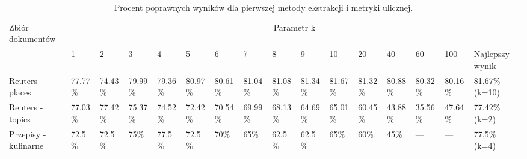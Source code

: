 \documentclass{classrep}
\begin{document}
\begingroup
{\scriptsize  
\setlength{\LTleft}{-20cm plus -1fill}
\setlength{\LTright}{\LTleft}

\clearpage

\begin{longtable}{|p{1cm}|p{0.7cm}|p{0.7cm}|p{0.7cm}|p{0.7cm}|p{0.7cm}|p{0.7cm}|p{0.7cm}|p{0.7cm}|p{0.7cm}|p{0.7cm}|p{0.7cm}|p{0.7cm}|p{0.7cm}|p{0.7cm}|p{1.1cm}|}
\caption{ Procent poprawnych wyników dla pierwszej metody ekstrakcji i metryki ulicznej.}\\ 
\hline

Zbiór
dokumentów

 &\multicolumn{15}{c|}{Parametr k}\\
\cline{2-16}
& 1
& 2
& 3
& 4
& 5
& 6
& 7
& 8
& 9
& 10
& 20
& 40
& 60
& 100
& Najlepszy wynik
\\ \hline\hline
Reuters
- places
& 77.77\%	%
& 74.43\%	%
& 79.99\%	%
& 79.36\%	%
& 80.97\%	%
& 80.61\%	%
& 81.04\%	%
& 81.08\%	%
& 81.34\%	%
& 81.67\%	%
& 81.32\%	%
& 80.88\%	%
& 80.32\%	%
& 80.16\%	%
& 81.67\% (k=10)
\\ \hline
Reuters
- topics
& 77.03\%	%
& 77.42\%	%
& 75.37\%	%
& 74.52\%	%
& 72.42\%	%
& 70.54\%	%
& 69.99\%	%
& 68.13\%	%
& 64.69\%	%
& 65.01\%	%
& 60.45\%	%
& 43.88\%	%
& 35.56\%	%
& 47.64\%	%
& 77.42\%	(k=2)
\\ \hline
Przepisy
- kulinarne 
& 72.5\%	%
& 72.5\%	%
& 75\%		%
& 77.5\%	%
& 72.5\%	%
& 70\%		%
& 65\%		%
& 62.5\%	%
& 62.5\%	%
& 65\%		%
& 60\%		%
& 45\%		%
& ---		%
& ---		%
& 77.5\% (k=4)
\\ \hline
\end{longtable}
}
\endgroup



\end{document}
